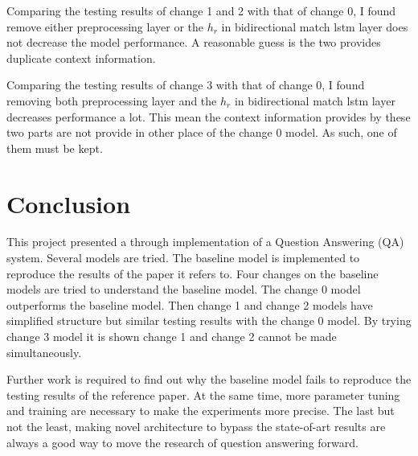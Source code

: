 \documentclass[modernstyle,12pt]{sjsuthesis}
\theoremstyle{definition}
\begin{document}
Comparing the testing results of change 1 and 2 with that of change 0, I found remove either preprocessing layer or the $h_r$ in bidirectional match lstm layer does not decrease the model performance. A reasonable guess is the two provides duplicate context information.

Comparing the testing results of change 3 with that of change 0, I found removing both preprocessing layer and the $h_r$ in bidirectional match lstm layer decreases performance a lot. This mean the context information provides by these two parts are not provide in other place of the change 0 model. As such, one of them must be kept.





\chapter{Conclusion}

This project presented a through implementation of a Question Answering (QA) system. Several models are tried. The baseline model is implemented to reproduce the results of the paper it refers to. Four changes on the baseline models are tried to understand the baseline model. The change 0 model outperforms the baseline model. Then change 1 and change 2 models have simplified structure but similar testing results with the change 0 model. By trying change 3 model it is shown change 1 and change 2 cannot be made simultaneously.

Further work is required to find out why the baseline model fails to reproduce the testing results of the reference paper. At the same time, more parameter tuning and training are necessary to make the experiments more precise. The last but not the least, making novel architecture to bypass the state-of-art results are always a good way to move the research of question answering forward.



%
%
%



\end{document}

